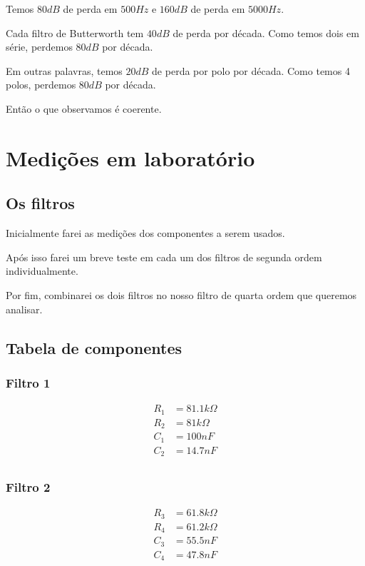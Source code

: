 \documentclass[12pt,twoside, a4paper, twocolumn]{article}
\begin{document}
Temos $80dB$ de perda em $500Hz$ e $160dB$ de perda em $5000Hz$.


Cada filtro de Butterworth tem $40dB$ de perda por década. Como temos dois em série, perdemos $80dB$ por década.


Em outras palavras, temos $20dB$ de perda por polo por década. Como temos 4 polos, perdemos $80dB$ por década.


Então o que observamos é coerente.


\pagebreak


\section{Medições em laboratório}




\subsection{Os filtros}


Inicialmente farei as medições dos componentes a serem usados.


Após isso farei um breve teste em cada um dos filtros de segunda ordem individualmente.


Por fim, combinarei os dois filtros no nosso filtro de quarta  ordem que queremos analisar.


\subsection{Tabela de componentes}


\subsubsection*{Filtro 1}
\begin{equation}
    \begin{aligned}
        R_1 & = 81.1k \varOmega \\
        R_2 & = 81k \varOmega   \\
        C_1 & = 100 nF          \\
        C_2 & = 14.7 nF         \\
    \end{aligned}
\end{equation}


\subsubsection*{Filtro 2}
\begin{equation}
    \begin{aligned}
        R_3 & = 61.8k \varOmega \\
        R_4 & = 61.2k \varOmega \\
        C_3 & = 55.5 nF         \\
        C_4 & = 47.8 nF         \\
    \end{aligned}
\end{equation}
\end{document}
